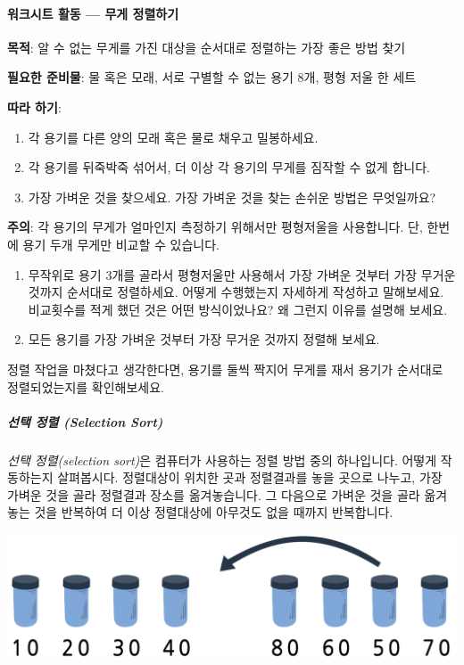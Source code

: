 \documentclass[]{article}
\begin{document}
\mbox{}\paragraph{워크시트 활동 --- 무게 정렬하기}\label{mdash--}

\textbf{목적}: 알 수 없는 무게를 가진 대상을 순서대로 정렬하는 가장 좋은
방법 찾기

\textbf{필요한 준비물}: 물 혹은 모래, 서로 구별할 수 없는 용기 8개, 평형
저울 한 세트

\textbf{따라 하기}:

\begin{enumerate}
\item
  각 용기를 다른 양의 모래 혹은 물로 채우고 밀봉하세요.
\item
  각 용기를 뒤죽박죽 섞어서, 더 이상 각 용기의 무게를 짐작할 수 없게
  합니다.
\item
  가장 가벼운 것을 찾으세요. 가장 가벼운 것을 찾는 손쉬운 방법은
  무엇일까요?
\end{enumerate}

\textbf{주의}: 각 용기의 무게가 얼마인지 측정하기 위해서만 평형저울을
사용합니다. 단, 한번에 용기 두개 무게만 비교할 수 있습니다.

\begin{enumerate}
\item
  무작위로 용기 3개를 골라서 평형저울만 사용해서 가장 가벼운 것부터 가장
  무거운 것까지 순서대로 정렬하세요. 어떻게 수행했는지 자세하게 작성하고
  말해보세요. 비교횟수를 적게 했던 것은 어떤 방식이었나요? 왜 그런지
  이유를 설명해 보세요.
\item
  모든 용기를 가장 가벼운 것부터 가장 무거운 것까지 정렬해 보세요.
\end{enumerate}

정렬 작업을 마쳤다고 생각한다면, 용기를 둘씩 짝지어 무게를 재서 용기가
순서대로 정렬되었는지를 확인해보세요.

\subparagraph{선택 정렬 (Selection Sort)}\label{selection-sort}

\emph{선택 정렬(selection sort)}은 컴퓨터가 사용하는 정렬 방법 중의
하나입니다. 어떻게 작동하는지 살펴봅시다. 정렬대상이 위치한 곳과
정렬결과를 놓을 곳으로 나누고, 가장 가벼운 것을 골라 정렬결과 장소를
옮겨놓습니다. 그 다음으로 가벼운 것을 골라 옮겨 놓는 것을 반복하여 더
이상 정렬대상에 아무것도 없을 때까지 반복합니다.

\includegraphics{csunplugged/02-part/img/ch07-sort/07-sort-01-selection.png}
\end{document}
